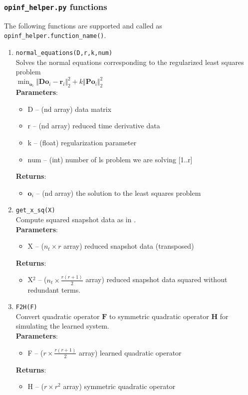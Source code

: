\documentclass[11pt]{article} %
\newcommand{\code}[1]{\colorbox{light-gray}{\texttt{#1}}}
\begin{document}
\subsubsection{\code{opinf\_helper.py} functions}
\label{sec:opinfhelperfunctions}
The following functions are supported and called as \code{opinf\_helper.function\_name()}. 
\begin{enumerate}

\item{\code{normal\_equations(D,r,k,num)}}\\
Solves the normal equations corresponding to the regularized least squares problem \\$\displaystyle\min_{\mathbf{o}_i} \Vert \mathbf{D}\mathbf{o}_i - \mathbf{r}_i\Vert_2^2 + k\Vert \mathbf{P}\mathbf{o}_i\Vert_2^2$\\
\textbf{Parameters}:
	\begin{itemize}
	\item[] D -- (nd array) data matrix
	\item[] r -- (nd array) reduced time derivative data 
	\item[] k -- (float) regularization parameter 
	\item[] num -- (int) number of ls problem we are solving [1..r]
	\end{itemize}
\textbf{Returns}:
\begin{itemize}
\item[] $\mathbf{o}_i$ -- (nd array) the solution to the least squares problem
\end{itemize}

\item{\code{get\_x\_sq(X)}}\\
Compute squared snapshot data as in \cite{ben}. \\
\textbf{Parameters}:
	\begin{itemize}
	\item[] X -- ($n_t \times r$ array) reduced snapshot data (transposed)
	\end{itemize}
\textbf{Returns}:
\begin{itemize}
\item[] X$^2$ -- ($n_t \times \frac{r(r+1)}{2}$ array) reduced snapshot data squared without redundant terms.
\end{itemize}

\item{\code{F2H(F)}}\\
Convert quadratic operator $\mathbf{F}$ to symmetric quadratic operator $\mathbf{H}$ for simulating the learned system.\\
\textbf{Parameters}:
	\begin{itemize}
	\item[] F -- ($r \times \frac{r(r+1)}{2}$ array) learned quadratic operator
	\end{itemize}
\textbf{Returns}:
\begin{itemize}
\item[] H -- ($r \times r^2$ array) symmetric quadratic operator
\end{itemize}

\end{enumerate}
\newpage
\end{document}
